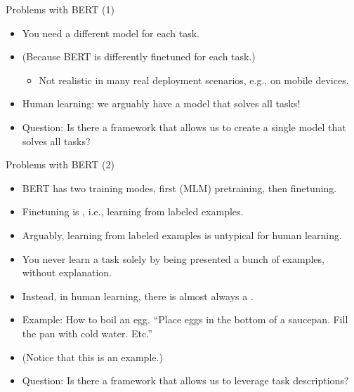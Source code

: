 \begin{vbframe}{Problems with BERT (1)}

\vfill

  \begin{itemize}
\item You need a different model for each task.
\item (Because BERT is differently finetuned for each task.)
  \begin{itemize}
\item Not realistic in many real deployment
scenarios, e.g., on mobile devices.
    \end{itemize}
\item Human learning: we arguably have a
 model that solves all tasks!
\item Question: Is there a framework that allows us to
create a single model that solves all tasks?
    \end{itemize}

\vfill

\end{vbframe}


\begin{vbframe}{Problems with BERT (2)}

\vfill
			
\begin{itemize}
\item BERT has two training modes, first (MLM)
pretraining, then finetuning.
\item Finetuning is ,
i.e., learning from labeled examples.
\item Arguably, learning from labeled examples is
untypical for human learning.
\item You never learn a task solely by being presented
a bunch of examples, without explanation.
\item Instead, in human learning, there is almost
always a .
\item Example: How to boil an egg.
``Place eggs in the bottom of a saucepan. Fill the pan with
cold water. Etc.''
\item  (Notice that this is  an example.)
\item Question: Is there a framework that allows us to
leverage task descriptions?
\end{itemize}

\vfill

\end{vbframe}

